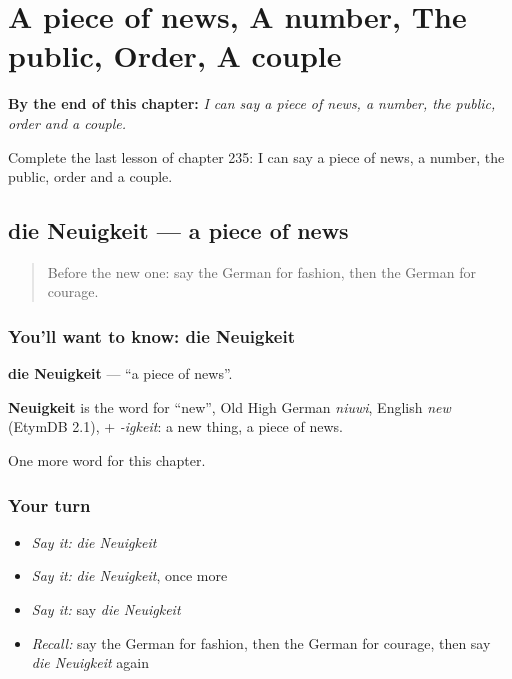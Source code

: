 
\chapter{A piece of news, A number, The public, Order, A couple}
\label{ch:ge-a-piece-of-news-a-number-the-public-order-a-couple}

\begin{chapteropening}
\textbf{By the end of this chapter:} \emph{I can say a piece of news, a number, the public, order and a couple.}

Complete the last lesson of chapter 235: I can say a piece of news, a number, the public, order and a couple.
\end{chapteropening}

\section[die Neuigkeit]{die Neuigkeit — a piece of news}

\label{lesson:GE-C235-neuigkeit}



\begin{quote}
Before the new one: say the German for fashion, then the German for courage.
\end{quote}

\subsection*{You'll want to know: die Neuigkeit}
\textbf{die Neuigkeit} — \textquotedblleft{}a piece of news\textquotedblright{}.

\begin{cousinweb}
\textbf{Neuigkeit} is the word for \textquotedblleft{}new\textquotedblright{}, Old High German \emph{niuwi}, English \emph{new} (EtymDB 2.1), + \emph{-igkeit}: a new thing, a piece of news.
\end{cousinweb}

\begin{grammarlens}[title={What you've built}]
One more word for this chapter.
\end{grammarlens}

\subsection*{Your turn}
\begin{itemize}
\raggedright
  \item \emph{Say it:} \emph{die Neuigkeit}
  \item \emph{Say it:} \emph{die Neuigkeit}, once more
  \item \emph{Say it:} say \emph{die Neuigkeit}
  \item \emph{Recall:} say the German for fashion, then the German for courage, then say \emph{die Neuigkeit} again
\end{itemize}

